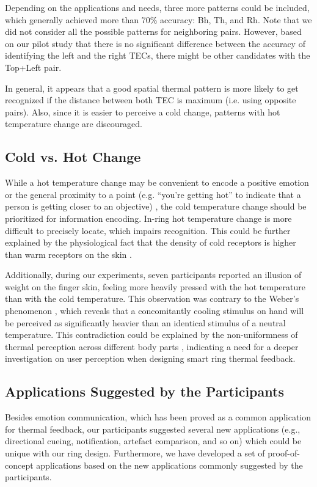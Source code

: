\documentclass[preprint,12pt]{elsarticle}
\begin{document}
Depending on the applications and needs, three more patterns could be included, which generally achieved more than 70\% accuracy: Bh, Th, and Rh. Note that we did not consider all the possible patterns for neighboring pairs. However, based on our pilot study that there is no significant difference between the accuracy of identifying the left and the right TECs, there might be other candidates with the Top+Left pair.

In general, it appears that a good spatial thermal pattern is more likely to get recognized if the distance between both TEC is maximum (i.e. using opposite pairs). Also, since it is easier to perceive a cold change, patterns with hot temperature change are discouraged.

\subsection{Cold vs. Hot Change}
While a hot temperature change may be convenient to encode a positive emotion \cite{41} or the general proximity to a point (e.g. ``you're getting hot'' to indicate that a person is getting closer to an objective) \cite{34}, the cold temperature change should be prioritized for information encoding. In-ring hot temperature change is more difficult to precisely locate, which impairs recognition. This could be further explained by the physiological fact that the density of  cold receptors is higher than warm receptors on the skin \cite{15}.

Additionally, during our experiments, seven participants reported an illusion of weight on the finger skin, feeling more heavily pressed with the hot temperature than with the cold temperature. This observation was contrary to the Weber's phenomenon \cite{4}, which reveals that a concomitantly cooling stimulus on hand will be perceived as significantly heavier than an identical stimulus of a neutral temperature. This contradiction could be explained by the non-uniformness of thermal perception across different body parts \cite{31}, indicating a need for a deeper investigation on user perception when designing smart ring thermal feedback.

\subsection{Applications Suggested by the Participants}
Besides emotion communication, which has been proved as a common application for thermal feedback, our participants suggested several new applications (e.g., directional cueing, notification, artefact comparison, and so on) which could be unique with our ring design. Furthermore, we have developed a set of proof-of-concept applications based on the new applications commonly suggested by the participants.
\end{document}

